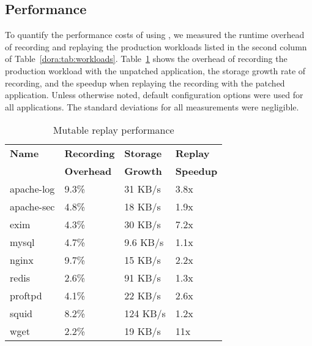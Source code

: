 \subsection{Performance}
\label{dora:sec:performance}

To quantify the performance costs of using {\dora}, we measured the
runtime overhead of recording and replaying the production workloads 
listed in the second column of Table~\ref{dora:tab:workloads}.
Table~\ref{dora:tab:performance} shows the overhead of recording the
production workload with the unpatched application,
the storage growth rate of recording, and the
speedup when replaying the recording with the patched application.
Unless otherwise noted, default configuration options were used for
all applications.  The standard deviations for all measurements were
negligible.

\begin{table}[t]
\begin{center}
\begin{tabular}{|l|l|l|l|}   \hline
  {\bf Name}   & {\bf Recording } & {\bf Storage } & {\bf Replay } \\
               & {\bf Overhead}   & {\bf Growth}   & {\bf Speedup} \\ \hline
		apache-log & 9.3\%            & 31 KB/s        & 3.8x          \\ \hline
		apache-sec & 4.8\%            & 18 KB/s        & 1.9x          \\ \hline
		exim       & 4.3\%            & 30 KB/s        & 7.2x          \\ \hline
		mysql      & 4.7\%            & 9.6 KB/s       & 1.1x          \\ \hline
		nginx      & 9.7\%            & 15 KB/s        & 2.2x          \\ \hline
		redis      & 2.6\%            & 91 KB/s        & 1.3x          \\ \hline
		proftpd    & 4.1\%            & 22 KB/s        & 2.6x          \\ \hline
		squid      & 8.2\%            & 124 KB/s       & 1.2x          \\ \hline
		wget       & 2.2\%            & 19 KB/s        & 11x           \\ \hline
\end{tabular}
\end{center}
\vspace{-1em}
\caption{Mutable replay performance}
\label{dora:tab:performance}
\end{table}

